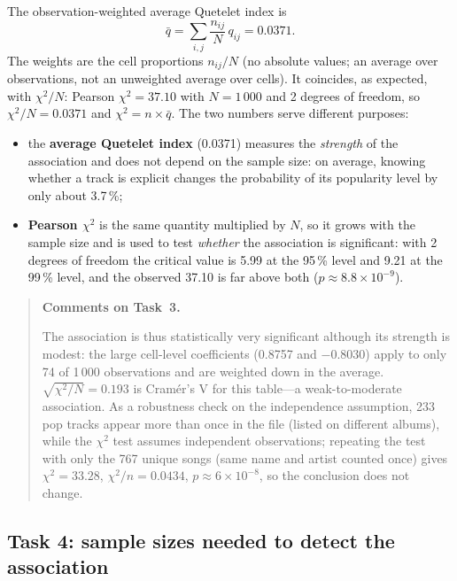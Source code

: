 \documentclass[11pt,letterpaper]{article}
\newenvironment{taskcomments}[1][Comments]{%
  \par\medskip\noindent
  \begin{quote}\small\textbf{#1.}\enspace\ignorespaces
}{%
  \end{quote}\medskip
}
\begin{document}
The observation-weighted average Quetelet index is
\begin{equation}
  \bar{q} = \sum_{i,j} \frac{n_{ij}}{N}\,q_{ij} = 0.0371 .
\end{equation}
The weights are the cell proportions $n_{ij}/N$ (no absolute values; an
average over observations, not an unweighted average over cells). It
coincides, as expected, with $\chi^2/N$: Pearson $\chi^2 = 37.10$ with
$N = 1\,000$ and 2 degrees of freedom, so $\chi^2/N = 0.0371$ and
$\chi^2 = n \times \bar q$. The two numbers serve different purposes:
\begin{itemize}
  \item the \textbf{average Quetelet index} (0.0371) measures the
        \emph{strength} of the association and does not depend on the sample
        size: on average, knowing whether a track is explicit changes the
        probability of its popularity level by only about 3.7\,\%;
  \item \textbf{Pearson $\chi^2$} is the same quantity multiplied by $N$, so
        it grows with the sample size and is used to test \emph{whether} the
        association is significant: with 2 degrees of freedom the critical
        value is 5.99 at the 95\,\% level and 9.21 at the 99\,\% level, and
        the observed 37.10 is far above both ($p \approx 8.8\times10^{-9}$).
\end{itemize}

\begin{taskcomments}[Comments on Task~3]
The association is thus statistically very significant although its strength
is modest: the large cell-level coefficients (0.8757 and $-0.8030$) apply to
only 74 of 1\,000 observations and are weighted down in the average.
$\sqrt{\chi^2/N} = 0.193$ is Cram\'er's V for this table---a weak-to-moderate
association. As a robustness check on the independence assumption, 233 pop
tracks appear more than once in the file (listed on different albums), while
the $\chi^2$ test assumes independent observations; repeating the test with
only the 767 unique songs (same name and artist counted once) gives $\chi^2 =
33.28$, $\chi^2/n = 0.0434$, $p \approx 6\times10^{-8}$, so the conclusion
does not change.
\end{taskcomments}

\subsection{Task 4: sample sizes needed to detect the association}\label{sec:a4t4}
\end{document}
